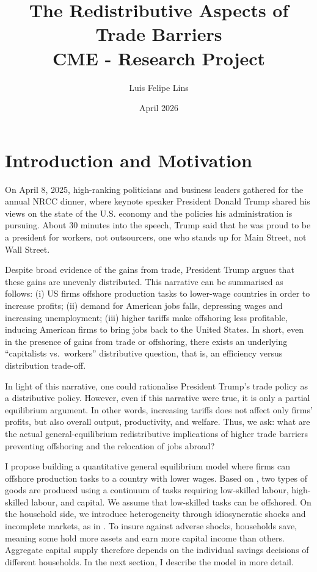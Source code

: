 \documentclass{article}
\title{The Redistributive Aspects of Trade Barriers \\ \large CME - Research Project}
\author{Luis Felipe Lins}
\date{April 2026}
\begin{document}
\maketitle

\vspace{-1cm}
\section{Introduction and Motivation}
\vspace{-0.3cm}

On April 8, 2025, high-ranking politicians and business leaders gathered for the annual NRCC dinner, where keynote speaker President Donald Trump shared his views on the state of the U.S. economy and the policies his administration is pursuing. About 30 minutes into the speech, Trump said that he was proud to be a president for workers, not outsourcers, one who stands up for Main Street, not Wall Street.

Despite broad evidence of the gains from trade, President Trump argues that these  gains are unevenly distributed. This narrative can be summarised as follows: (i) US  firms offshore production tasks to lower-wage countries in order to increase profits; (ii) demand for American jobs falls, depressing wages and increasing unemployment; (iii) higher tariffs make offshoring less profitable, inducing American firms to bring jobs back to the United States. In short, even in the presence of gains from trade or offshoring, there exists an underlying ``capitalists vs.\ workers'' distributive question, that is, an efficiency versus distribution trade-off.

In light of this narrative, one could rationalise President Trump's trade policy as a distributive policy. However, even if this narrative were true, it is only a partial equilibrium argument. In other words, increasing tariffs does not affect only firms' profits, but also overall output, productivity, and welfare. Thus, we ask: what are the actual general-equilibrium redistributive implications of higher trade barriers preventing offshoring and the relocation of jobs abroad?

I propose building a quantitative general equilibrium model where firms can offshore production tasks to a country with lower wages. Based on \cite{grossman2008}, two types of goods are produced using a continuum of tasks requiring low-skilled labour, high-skilled labour, and capital. We assume that low-skilled tasks can be offshored. On the household side, we introduce heterogeneity through idiosyncratic shocks and incomplete markets, as in \cite{aiyagari1994}. To insure against adverse shocks, households save, meaning some hold more assets and earn more capital income than others. Aggregate capital supply therefore depends on the individual savings decisions of different households. In the next section, I describe the model in more detail.
\end{document}
